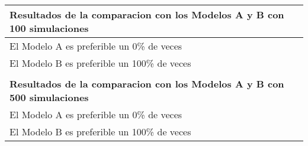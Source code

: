 \begin{table}[H]
\begin{tabular}{|l|}
 \\ \hline
\textbf{Resultados de la comparacion con los Modelos A  y B con 100 simulaciones} \\ \hline
El Modelo A es preferible un 0\% de veces \\ \hline
El Modelo B es preferible un 100\% de veces \\ \hline
 \\ \hline
\textbf{Resultados de la comparacion con los Modelos A  y B con 500 simulaciones} \\ \hline
El Modelo A es preferible un 0\% de veces \\ \hline
El Modelo B es preferible un 100\% de veces \\ \hline
\end{tabular}
\end{table}

